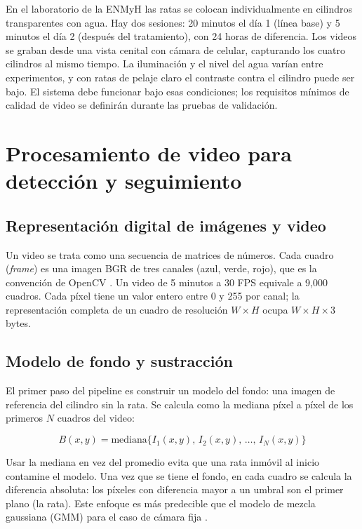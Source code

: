 En el laboratorio de la ENMyH las ratas se colocan individualmente en cilindros
transparentes con agua. Hay dos sesiones: 20 minutos el día 1 (línea base) y 5 minutos
el día 2 (después del tratamiento), con 24 horas de diferencia. Los videos se graban
desde una vista cenital con cámara de celular, capturando los cuatro cilindros al mismo
tiempo. La iluminación y el nivel del agua varían entre experimentos, y con ratas de
pelaje claro el contraste contra el cilindro puede ser bajo. El sistema debe funcionar
bajo esas condiciones; los requisitos mínimos de calidad de video se definirán durante
las pruebas de validación.

\section{Procesamiento de video para detección y seguimiento}

\subsection{Representación digital de imágenes y video}

Un video se trata como una secuencia de matrices de números. Cada cuadro
(\textit{frame}) es una imagen BGR de tres canales (azul, verde, rojo), que es la
convención de OpenCV \cite{bradski2000}. Un video de 5 minutos a 30 FPS equivale a
9{,}000 cuadros. Cada píxel tiene un valor entero entre 0 y 255 por canal; la
representación completa de un cuadro de resolución $W \times H$ ocupa $W \times H
\times 3$ bytes.

\subsection{Modelo de fondo y sustracción}

El primer paso del pipeline es construir un modelo del fondo: una imagen de referencia
del cilindro sin la rata. Se calcula como la mediana píxel a píxel de los primeros
$N$ cuadros del video:

\begin{equation}
    B(x,y) = \text{mediana}\bigl\{ I_1(x,y),\, I_2(x,y),\, \ldots,\, I_N(x,y) \bigr\}
    \label{eq:fondo}
\end{equation}

Usar la mediana en vez del promedio evita que una rata inmóvil al inicio contamine el
modelo. Una vez que se tiene el fondo, en cada cuadro se calcula la diferencia absoluta:
los píxeles con diferencia mayor a un umbral son el primer plano (la rata). Este enfoque
es más predecible que el modelo de mezcla gaussiana (GMM) \cite{zivkovic2004} para el
caso de cámara fija \cite{piccardi2004}.

